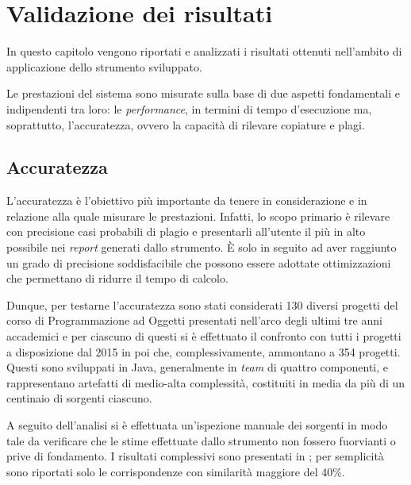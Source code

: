 \chapter{Validazione dei risultati}
\label{chapter:validation}
In questo capitolo vengono riportati e analizzati i risultati ottenuti nell'ambito di applicazione dello strumento sviluppato.

\vspace*{0.5cm}

Le prestazioni del sistema sono misurate sulla base di due aspetti fondamentali e indipendenti tra loro: le \textit{performance}, in termini di tempo d'esecuzione ma, soprattutto, l'accuratezza, ovvero la capacità di rilevare copiature e plagi.

\section{Accuratezza}
L'accuratezza è l'obiettivo più importante da tenere in considerazione e in relazione alla quale misurare le prestazioni.
%
Infatti, lo scopo primario è rilevare con precisione casi probabili di plagio e presentarli all'utente il più in alto possibile nei \textit{report} generati dallo strumento.
%
\`E solo in seguito ad aver raggiunto un grado di precisione soddisfacibile che possono essere adottate ottimizzazioni che permettano di ridurre il tempo di calcolo.

Dunque, per testarne l'accuratezza sono stati considerati 130 diversi progetti del corso di Programmazione ad Oggetti presentati nell'arco degli ultimi tre anni accademici e per ciascuno di questi si è effettuato il confronto con tutti i progetti a disposizione dal 2015 in poi che, complessivamente, ammontano a 354 progetti.
%
Questi sono sviluppati in Java, generalmente in \textit{team} di quattro componenti, e rappresentano artefatti di medio-alta complessità, costituiti in media da più di un centinaio di sorgenti ciascuno.

A seguito dell'analisi si è effettuata un'ispezione manuale dei sorgenti in modo tale da verificare che le stime effettuate dallo strumento non fossero fuorvianti o prive di fondamento.
%
I risultati complessivi sono presentati in ; per semplicità sono riportati solo le corrispondenze con similarità maggiore del 40\%.

